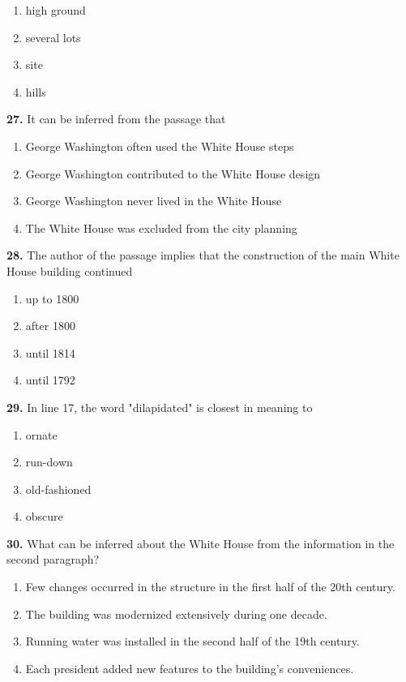 \documentclass[12pt]{article}
\begin{document}
\begin{enumerate}[label=(\Alph*),leftmargin=*,itemsep=0.2em]
\item high ground
\item several lots
\item site
\item hills
\end{enumerate}
\par
\vspace{0.25\baselineskip}
\noindent\textbf{27.} It can be inferred from the passage that
\begin{enumerate}[label=(\Alph*),leftmargin=*,itemsep=0.2em]
\item George Washington often used the White House steps
\item George Washington contributed to the White House design
\item George Washington never lived in the White House
\item The White House was excluded from the city planning
\end{enumerate}
\par
\vspace{0.25\baselineskip}
\noindent\textbf{28.} The author of the passage implies that the construction of the main White House building continued
\begin{enumerate}[label=(\Alph*),leftmargin=*,itemsep=0.2em]
\item up to 1800
\item after 1800
\item until 1814
\item until 1792
\end{enumerate}
\par
\vspace{0.25\baselineskip}
\noindent\textbf{29.} In line 17, the word "dilapidated" is closest in meaning to
\begin{enumerate}[label=(\Alph*),leftmargin=*,itemsep=0.2em]
\item ornate
\item run-down
\item old-fashioned
\item obscure
\end{enumerate}
\par
\vspace{0.25\baselineskip}
\noindent\textbf{30.} What can be inferred about the White House from the information in the second paragraph?
\begin{enumerate}[label=(\Alph*),leftmargin=*,itemsep=0.2em]
\item Few changes occurred in the structure in the first half of the 20th century.
\item The building was modernized extensively during one decade.
\item Running water was installed in the second half of the 19th century.
\item Each president added new features to the building's conveniences.
\end{enumerate}
\end{document}
